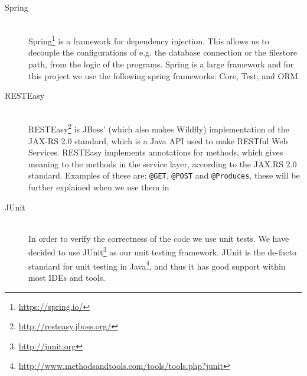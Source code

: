 \begin{description}
    \item[Spring] \hfill \\
        Spring\footnote{\url{https://spring.io/}} is a framework for dependency injection.
        This allows us to decouple the configurations of e.g. the database connection or the filestore path, from the logic of the programs.
        Spring is a large framework and for this project we use the following spring frameworks: Core, Test, and ORM.

    \item[RESTEasy] \hfill \\
        RESTEasy\footnote{\url{http://resteasy.jboss.org/}} is JBoss' (which also makes Wildfly) implementation of the JAX-RS 2.0 standard, which is a Java API used to make RESTful Web Services.
        RESTEasy implements annotations for methods, which gives meaning to the methods in the service layer, according to the JAX.RS 2.0 standard.
        Examples of these are: \texttt{@GET}, \texttt{@POST} and \texttt{@Produces}, these will be further explained when we use them in 
    
    \item[JUnit] \hfill \\
        In order to verify the correctness of the code we use unit tests.
        We have decided to use JUnit\footnote{\url{http://junit.org}} as our unit testing framework.
        JUnit is the de-facto standard for unit testing in Java\footnote{\url{http://www.methodsandtools.com/tools/tools.php?junit}}, and thus it has good support within most IDEs and tools.

\end{description}
